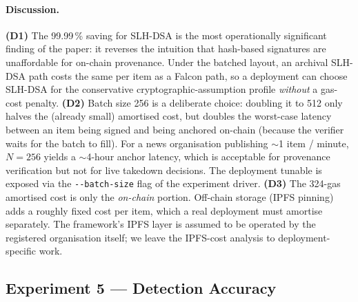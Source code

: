 \documentclass[11pt,a4paper]{article}
\theoremstyle{definition}
\theoremstyle{plain}
\theoremstyle{remark}
\begin{document}
\paragraph{Discussion.}
\textbf{(D1)} The 99.99\,\% saving for SLH-DSA is the most
operationally significant finding of the paper: it reverses the
intuition that hash-based signatures are unaffordable for on-chain
provenance. Under the batched layout, an archival SLH-DSA path costs
the same per item as a Falcon path, so a deployment can choose
SLH-DSA for the conservative cryptographic-assumption profile
\emph{without} a gas-cost penalty.
\textbf{(D2)} Batch size 256 is a deliberate choice: doubling it to
512 only halves the (already small) amortised cost, but doubles the
worst-case latency between an item being signed and being anchored
on-chain (because the verifier waits for the batch to fill). For a
news organisation publishing $\sim$1 item / minute, $N\!=\!256$
yields a $\sim$4-hour anchor latency, which is acceptable for
provenance verification but not for live takedown decisions. The
deployment tunable is exposed via the
\verb|--batch-size| flag of the experiment driver.
\textbf{(D3)} The 324-gas amortised cost is only the
\emph{on-chain} portion. Off-chain storage (IPFS pinning) adds a
roughly fixed cost per item, which a real deployment must amortise
separately. The framework's IPFS layer is assumed to be operated by
the registered organisation itself; we leave the IPFS-cost analysis
to deployment-specific work.

\subsection{Experiment 5 --- Detection Accuracy}\label{sec:exp5}
\end{document}
